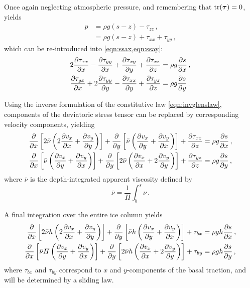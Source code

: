 \documentclass{article}
\newcommand{\tens}[1]{\vb*{#1}} %
\newcommand{\DST}[0]{\tens{\tau}}       %
\begin{document}
Once again neglecting atmospheric pressure, and remembering that $\tr(\DST)=0$,
 yields
\begin{align}
    p &= \rho g (s-z) - \tau_{zz} \,, \\
      &= \rho g (s-z) + \tau_{xx} + \tau_{yy} \,,
\end{align}
which can be re-introduced into \cref{eqn:ssax,eqn:ssay}:
\begin{subequations}
\begin{align}
    2\pdv{\tau_{xx}}{x} - \pdv{\tau_{yy}}{x} + \pdv{\tau_{xy}}{y}
        + \pdv{\tau_{xz}}{z} &= \rho g \pdv{s}{x} \,, \\
    \pdv{\tau_{yx}}{x} + 2\pdv{\tau_{yy}}{y} - \pdv{\tau_{xx}}{y}
        + \pdv{\tau_{yz}}{z} &= \rho g \pdv{s}{y} \,.
\end{align}
\end{subequations}

Using the inverse formulation of the constitutive law \eqref{eqn:invglenslaw},
components of the deviatoric stress tensor can be replaced by corresponding
velocity components, yielding
\begin{subequations}
\begin{align}
    \pdv{x} \left[2\bar{\nu}
                  \left(2\pdv{v_x}{x} + \pdv{v_y}{y}\right) \right]
        + \pdv{y} \left[\bar{\nu}
                        \left(\pdv{v_x}{y} + \pdv{v_y}{x}\right) \right]
        + \pdv{\tau_{xz}}{z} &= \rho g \pdv{s}{x} \,, \\
    \pdv{x} \left[\bar{\nu}
                  \left(\pdv{v_x}{y} + \pdv{v_y}{x}\right) \right]
        + \pdv{y} \left[2\bar{\nu}
                        \left(\pdv{v_x}{x} + 2\pdv{v_y}{y}\right) \right]
         + \pdv{\tau_{yz}}{z} &= \rho g \pdv{s}{y} \,,
\end{align}
\end{subequations}
where $\bar{\nu}$ is the depth-integrated apparent viscosity defined by
\begin{equation}
    \bar{\nu} = \frac{1}{H}\int_b^s\nu \,.
\end{equation}

A final integration over the entire ice column yields
\begin{subequations}
\begin{align}
    \label{eqn:vssa}
    \pdv{x} \left[2\bar{\nu}h
                  \left(2\pdv{v_x}{x} + \pdv{v_y}{y}\right) \right]
        + \pdv{y} \left[\bar{\nu}h
                        \left(\pdv{v_x}{y} + \pdv{v_y}{x}\right) \right]
        + \tau_{bx} &= \rho gh \pdv{s}{x} \,, \\
    \pdv{x} \left[\bar{\nu}H
                  \left(\pdv{v_x}{y} + \pdv{v_y}{x}\right) \right]
        + \pdv{y} \left[2\bar{\nu}h
                        \left(\pdv{v_x}{x} + 2\pdv{v_y}{y}\right) \right]
        + \tau_{by} &= \rho gh \pdv{s}{y} \,,
\end{align}
\end{subequations}
where $\tau_{bx}$ and $\tau_{by}$ correspond to $x$ and $y$-components of the
basal traction, and will be determined by a sliding law.
\end{document}
